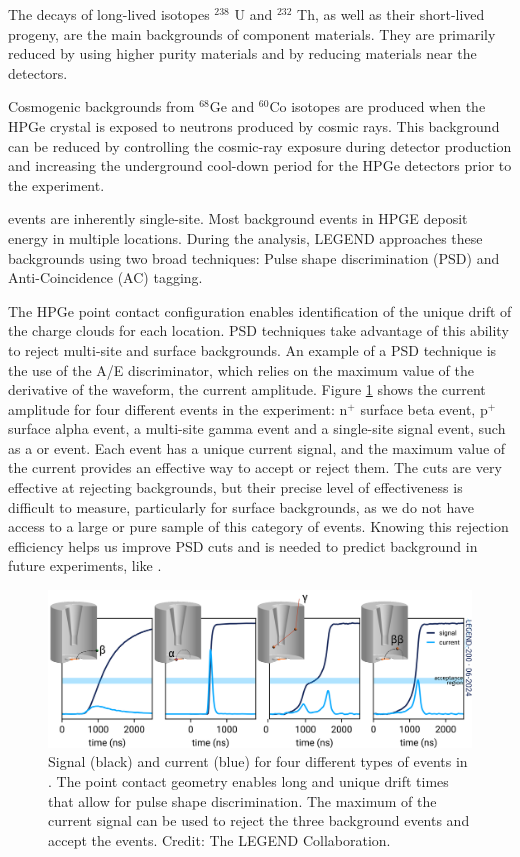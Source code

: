 The decays of long-lived isotopes $^{238}$ U and $^{232}$ Th, as well as their short-lived progeny, are the main backgrounds of component materials. They are primarily reduced by using higher purity materials and by reducing materials near the detectors. 

Cosmogenic backgrounds from $^{68}$Ge and $^{60}$Co isotopes are produced when the HPGe crystal is exposed to neutrons produced by cosmic rays. This background can be reduced by controlling the cosmic-ray exposure during detector production and increasing the underground cool-down period for the HPGe detectors prior to the experiment.

{\onbb} events are inherently single-site. Most background events in HPGE deposit energy in multiple locations. During the analysis, LEGEND approaches these backgrounds using two broad techniques: Pulse shape discrimination (PSD) and Anti-Coincidence (AC) tagging.

The HPGe point contact configuration enables identification of the unique drift of the charge clouds for each location. PSD techniques take advantage of this ability to reject multi-site and surface backgrounds. An example of a PSD technique is the use of the A/E discriminator, which relies on the maximum value of the derivative of the waveform, the current amplitude. Figure \ref{ch2_fig_cur_exp} shows the current amplitude for four different events in the experiment: n$^+$ surface beta event, p$^+$ surface alpha event, a multi-site gamma event and a single-site signal event, such as a {\onbb} or {\tnbb} event. Each event has a unique current signal, and the maximum value of the current provides an effective way to accept or reject them. The cuts are very effective at rejecting backgrounds, but their precise level of effectiveness is difficult to measure, particularly for surface backgrounds, as we do not have access to a large or pure sample of this category of events. Knowing this rejection efficiency helps us improve PSD cuts and is needed to predict background in future experiments, like {\Lthou}.


\begin{figure}[!htb]
\centering
  \includegraphics[width=0.99\linewidth]{ch2/figs/psd-showcase.png}
  \caption{Signal (black) and current (blue) for four different types of events in {\Ltwo}. The point contact geometry enables long and unique drift times that allow for pulse shape discrimination. The maximum of the current signal can be used to reject the three background events and accept the {\tnbb} events. Credit: The LEGEND Collaboration.}
\label{ch2_fig_cur_exp}
  \end{figure}
  
